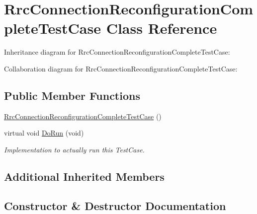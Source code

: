 \hypertarget{classRrcConnectionReconfigurationCompleteTestCase}{}\section{Rrc\+Connection\+Reconfiguration\+Complete\+Test\+Case Class Reference}
\label{classRrcConnectionReconfigurationCompleteTestCase}


Inheritance diagram for Rrc\+Connection\+Reconfiguration\+Complete\+Test\+Case\+:


Collaboration diagram for Rrc\+Connection\+Reconfiguration\+Complete\+Test\+Case\+:
\subsection*{Public Member Functions}
\begin{DoxyCompactItemize}
\item 
\hyperlink{classRrcConnectionReconfigurationCompleteTestCase_ac96efdf52b121318568a0a38d71812be}{Rrc\+Connection\+Reconfiguration\+Complete\+Test\+Case} ()
\item 
virtual void \hyperlink{classRrcConnectionReconfigurationCompleteTestCase_a811358e619874b2e388db76d924a0574}{Do\+Run} (void)
\begin{DoxyCompactList}\small\item\em Implementation to actually run this Test\+Case. \end{DoxyCompactList}\end{DoxyCompactItemize}
\subsection*{Additional Inherited Members}


\subsection{Constructor \& Destructor Documentation}
